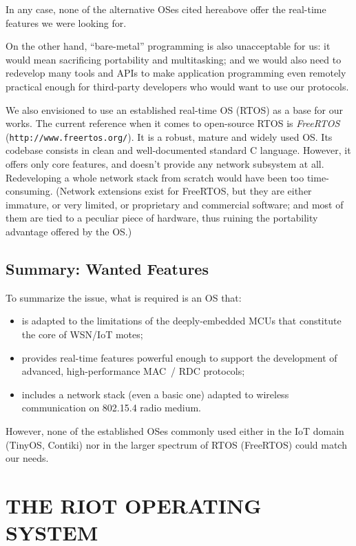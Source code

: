\documentclass[a4paper,twoside]{article}
\begin{document}
In any case, none of the alternative OSes cited hereabove offer the real-time
features we were looking for.

\bigskip

On the other hand, ``bare-metal'' programming is also unacceptable for us:
it would mean sacrificing portability and multitasking; and we would also
need to redevelop many tools and APIs to make application programming
even remotely practical enough for third-party developers who would
want to use our protocols.

\bigskip

We also envisioned to use an established real-time OS (RTOS) as a base
for our works. The current reference when it comes to open-source RTOS is
\emph{FreeRTOS} (\texttt{http://www.freertos.org/}). It is a robust, mature
and widely used OS. Its codebase consists in clean and well-documented
standard C language. However, it offers only core features, and doesn't
provide any network subsystem at all. Redeveloping a whole network stack
from scratch would have been too time-consuming.
(Network extensions exist for FreeRTOS, but they are either immature,
or very limited, or proprietary and commercial software; and most of them
are tied to a peculiar piece of hardware, thus ruining
the portability advantage offered by the OS.)

\subsection{Summary: Wanted Features}

To summarize the issue, what is required is an OS that:
\begin{itemize}
\item is adapted to the limitations of the deeply-embedded MCUs that
      constitute the core of WSN/IoT motes;
\item provides real-time features powerful enough to support the
      development of advanced, high-performance MAC~/ RDC protocols;
\item includes a network stack (even a basic one) adapted to wireless
      communication on 802.15.4 radio medium.
\end{itemize}
However, none of the established OSes commonly used either in the IoT domain
(TinyOS, Contiki) nor in the larger spectrum of RTOS (FreeRTOS)
could match our needs.


\section{\uppercase{The RIOT Operating System}}
\end{document}
